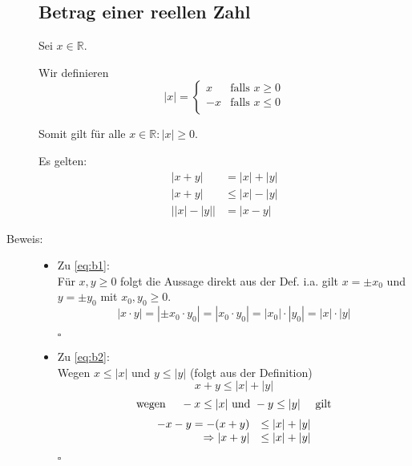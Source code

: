 \documentclass[12pt,a4paper,leqno]{article}
\begin{document}
\begin{description}
\subsection*{Betrag einer reellen Zahl}

Sei $x \in \mathbb{R}$.

Wir definieren 
\begin{equation*}
|x| = 
	\begin{cases}
		x & \textrm{falls } x \geq 0\\
		-x & \textrm{falls } x \leq 0\\
	\end{cases}
\end{equation*}


Somit gilt für alle $x \in \mathbb{R}: |x| \geq 0$.

Es gelten:
\renewcommand{\theequation}{B\arabic{equation}}
\setcounter{equation}{0}
\begin{align}
	\label{eq:b1} |x+y| &= |x| + |y| \\
	\label{eq:b2} |x+y| &\leq |x|-|y| \\	
	\label{eq:b3} \big||x|-|y|\big| &= |x-y|
\end{align}

\item[Beweis:] \hfill

\begin{itemize}
\item[] Zu \eqref{eq:b1}: \\
	 Für $x, y \geq 0$ folgt die Aussage direkt aus der Def. i.a. gilt $x = \pm x_0$ und $y = \pm y_0$ mit $x_0, y_0 \geq 0$.
	 $$|x\cdot y| =  |\pm x_0\cdot y_0 | = |x_0 \cdot y_0| = |x_0|\cdot|y_0|=|x|\cdot|y|$$
	 \begin{flushright}$\square$\end{flushright}

\item[] Zu \eqref{eq:b2}: \\
	Wegen $ x \leq |x|$ und $y \leq |y|$ (folgt aus der Definition)
	$$x + y \leq |x| + |y|$$
	$$\textrm{wegen } \quad -x \leq |x| \\ \textrm{ und } -y \leq |y| \quad \textrm{ gilt}$$
	$$\begin{array}{r l}
		   -x - y = -(x+y)  &\leq |x| + |y| \\
		\Rightarrow |x + y| &\leq |x| + |y|	
	\end{array}$$
	 \begin{flushright}$\square$\end{flushright}



\end{itemize}
\end{description}
\end{document}

